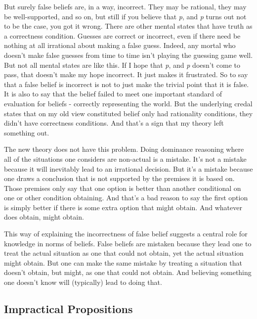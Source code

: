\documentclass[
  11pt,
]{book}
\begin{document}
But surely false beliefs are, in a way, incorrect. They may be rational, they may be well-supported, and so on, but still if you believe that \emph{p}, and \emph{p} turns out not to be the case, you got it wrong. There are other mental states that have truth as a correctness condition. Guesses are correct or incorrect, even if there need be nothing at all irrational about making a false guess. Indeed, any mortal who doesn't make false guesses from time to time isn't playing the guessing game well. But not all mental states are like this. If I hope that \emph{p}, and \emph{p} doesn't come to pass, that doesn't make my hope incorrect. It just makes it frustrated. So to say that a false belief is incorrect is not to just make the trivial point that it is false. It is also to say that the belief failed to meet one important standard of evaluation for beliefs - correctly representing the world. But the underlying credal states that on my old view constituted belief only had rationality conditions, they didn't have correctness conditions. And that's a sign that my theory left something out.

The new theory does not have this problem. Doing dominance reasoning where all of the situations one considers are non-actual is a mistake. It's not a mistake because it will inevitably lead to an irrational decision. But it's a mistake because one draws a conclusion that is not supported by the premises it is based on. Those premises only say that one option is better than another conditional on one or other condition obtaining. And that's a bad reason to say the first option is simply better if there is some extra option that might obtain. And whatever does obtain, might obtain.

This way of explaining the incorrectness of false belief suggests a central role for knowledge in norms of beliefs. False beliefs are mistaken because they lead one to treat the actual situation as one that could not obtain, yet the actual situation might obtain. But one can make the same mistake by treating a situation that doesn't obtain, but might, as one that could not obtain. And believing something one doesn't know will (typically) lead to doing that.

\hypertarget{meimpractical}{%
\subsection{Impractical Propositions}\label{meimpractical}}
\end{document}
